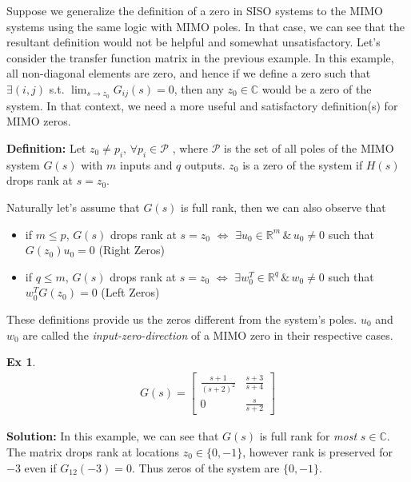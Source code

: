 \documentclass[twoside]{article}
\newtheorem{exmp}[theorem]{Ex}
\begin{document}
Suppose we generalize the definition of a zero in SISO systems to the MIMO systems using the same logic with MIMO poles. In that case, we can see that the resultant definition would not be helpful and somewhat unsatisfactory. Let's consider the transfer function matrix in the previous example. In this example, all non-diagonal elements are zero, and hence if we define a zero such that $\exists (i,j)$ s.t. $\lim_{s \to z_0}G_{ij}(s) = 0$, then any $z_0 \in \mathbb{C}$ would be a zero of the system. In that context, we need a more useful and satisfactory definition(s) for MIMO zeros.

\textbf{Definition:} Let $z_0 \neq p_i , \, \forall p_i \in \mathcal{P}$ , where $\mathcal{P}$ is the set of all poles of the MIMO system $G(s)$ with $m$ inputs and
$q$ outputs. $z_0$ is a zero of the system if $H(s)$ drops rank at $s = z_0$.

Naturally let's assume that $G(s)$ is full rank, then we can also observe that
\begin{itemize}
\item if $m \leq p$, $G(s)$ drops rank at $s = z_0$ $\iff$ $\exists u_0 \in \mathbb{R}^{m} \, \& \, u_0 \neq 0$ such that $G(z_0) u_0 = 0$ (Right Zeros)
\item if $q \leq m$, $G(s)$ drops rank at $s = z_0$ $\iff$ $\exists w_0^T \in \mathbb{R}^{q} \, \& \, w_0 \neq 0$ such that $w_0^T G(z_0) = 0$ (Left Zeros)
\end{itemize}

These definitions provide us the zeros different from the system's poles. $u_0$ and $w_0$ are called the \textit{input-zero-direction} of a MIMO zero in their respective cases. 
%
\begin{exmp}
	\begin{align*}
	G(s) = \left[ \begin{array}{ccc} \frac{s+1}{(s+2)^2} & \frac{s+3}{s+4}  \\  
	0 & \frac{s}{s+2}  \end{array} \right]
	\end{align*}
\end{exmp}
%
\textbf{Solution:} In this example, we can see that $G(s)$ is full rank for \textit{most} $s \in \mathbb{C}$. The matrix drops rank at locations
$z_0 \in \lbrace 0 , -1 \rbrace$, however rank is preserved for $-3$ even if $G_{12}(-3) = 0$. Thus zeros of the system 
are $\lbrace 0 , -1 \rbrace$.
\end{document}
